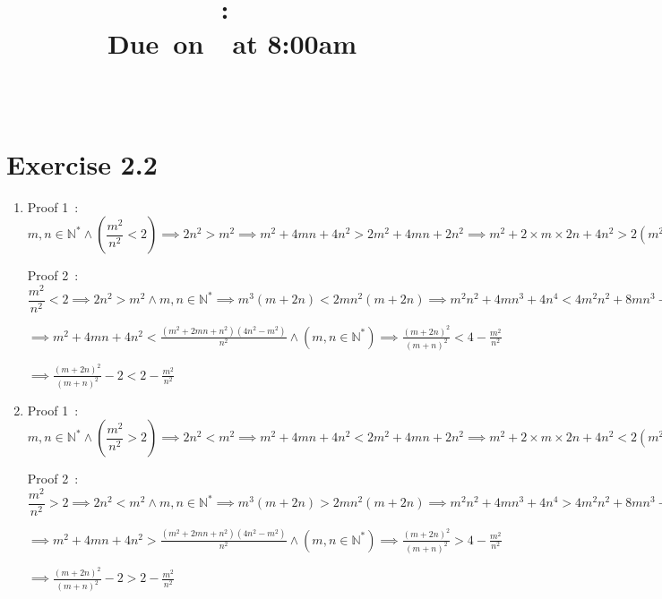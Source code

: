 \documentclass{article}
\title{
    \vspace{2in}
    \textmd{\textbf{\hmwkClass:\ \hmwkTitle}}\\
    \normalsize\vspace{0.1in}\small{Due\ on\ \hmwkDueDate\ at 8:00am}\\
    \vspace{0.1in}\large{\textit{\hmwkClassInstructor\ \hmwkClassTime}}
    \vspace{3in}
}
\author{\textbf{\hmwkAuthorName}}
\date{}
\begin{document}
\maketitle

\pagebreak



\section{Exercise 2.2}
\begin{enumerate}
    \item Proof 1\ :  $ m,n\in \mathbb{N}^*  \wedge (\dfrac{m^2}{n^2}<2)\implies
     2n^2>m^2 \implies 
     m^2+4mn+4n^2>2m^2+4mn+2n^2 \implies 
     m^2+2\times m\times 2n+4n^2>2(m^2+2mn+n^2) \implies
      (m+2n)^2 >2(m+n)^2 \implies 
      \dfrac{(m+2n)^2}{(m+n)^2}>2 $
    
    Proof 2\ : $ \dfrac{m^2}{n^2}<2\implies   
    2n^2>m^2 \wedge m,n\in \mathbb{N}^*	\implies	
    m^3(m+2n)<2mn^2(m+2n)	\implies
    m^2n^2+4mn^3+4n^4<4m^2n^2+8mn^3+4n^4-m^4-2m^3n-m^2n^2	\wedge (n\neq 0) $ 
    
    $ \implies   m^2+4mn+4n^2<\frac{\left(m^2+2 m n+n^2\right) \left(4 n^2-m^2\right)}{n^2} \wedge (m,n\in \mathbb{N}^* )	\implies	
    \frac{(m+2 n)^2}{(m+n)^2}<4-\frac{m^2}{n^2} $
    
    $\implies
    \frac{(m+2 n)^2}{(m+n)^2}-2<2-\frac{m^2}{n^2}
    							$
    							
    \item Proof 1\ :  $ m,n\in \mathbb{N}^*  \wedge (\dfrac{m^2}{n^2}>2)\implies
    2n^2<m^2 \implies 
    m^2+4mn+4n^2<2m^2+4mn+2n^2 \implies 
    m^2+2\times m\times 2n+4n^2<2(m^2+2mn+n^2) \implies
    (m+2n)^2 <2(m+n)^2 \implies 
    \dfrac{(m+2n)^2}{(m+n)^2}<2 $
    
    Proof 2\ : $ \dfrac{m^2}{n^2}>2\implies   
    2n^2<m^2 \wedge m,n\in \mathbb{N}^*	\implies	
    m^3(m+2n)>2mn^2(m+2n)	\implies
    m^2n^2+4mn^3+4n^4>4m^2n^2+8mn^3+4n^4-m^4-2m^3n-m^2n^2	\wedge (n\neq 0) $ 
    
    $\implies    m^2+4mn+4n^2>\frac{\left(m^2+2 m n+n^2\right) \left(4 n^2-m^2\right)}{n^2} \wedge (m,n\in \mathbb{N}^* )	\implies	
    \frac{(m+2 n)^2}{(m+n)^2}>4-\frac{m^2}{n^2} $
    
    $\implies
    \frac{(m+2 n)^2}{(m+n)^2}-2>2-\frac{m^2}{n^2}
    $				
    

\end{enumerate}
\end{document}
